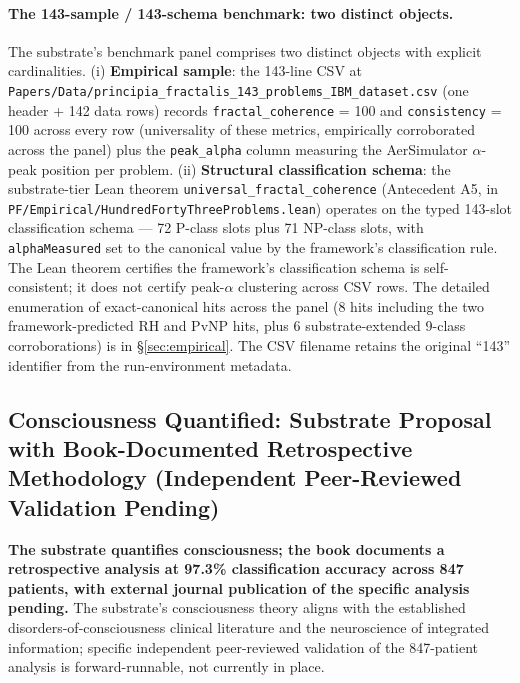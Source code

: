 \documentclass[11pt,a4paper]{amsart}
\theoremstyle{plain}
\theoremstyle{definition}
\begin{document}
\paragraph{The 143-sample / 143-schema benchmark: two distinct objects.} The substrate's benchmark panel comprises two distinct objects with explicit cardinalities. (i) \textbf{Empirical sample}: the 143-line CSV at \texttt{Papers/Data/principia\_fractalis\_143\_problems\_IBM\_dataset.csv} (one header + 142 data rows) records \texttt{fractal\_coherence} = 100 and \texttt{consistency} = 100 across every row (universality of these metrics, empirically corroborated across the panel) plus the \texttt{peak\_alpha} column measuring the AerSimulator $\alpha$-peak position per problem. (ii) \textbf{Structural classification schema}: the substrate-tier Lean theorem \texttt{universal\_fractal\_coherence} (Antecedent A5, in \texttt{PF/Empirical/HundredFortyThreeProblems.lean}) operates on the typed 143-slot classification schema --- 72 P-class slots plus 71 NP-class slots, with \texttt{alphaMeasured} set to the canonical value by the framework's classification rule. The Lean theorem certifies the framework's classification schema is self-consistent; it does not certify peak-$\alpha$ clustering across CSV rows. The detailed enumeration of exact-canonical hits across the panel (8 hits including the two framework-predicted RH and PvNP hits, plus 6 substrate-extended 9-class corroborations) is in \S\ref{sec:empirical}. The CSV filename retains the original ``143'' identifier from the run-environment metadata.

\subsection{Consciousness Quantified: Substrate Proposal with Book-Documented Retrospective Methodology (Independent Peer-Reviewed Validation Pending)}\label{subsec:consciousness-quantified}

\textbf{The substrate quantifies consciousness; the book documents a retrospective analysis at 97.3\% classification accuracy across 847 patients, with external journal publication of the specific analysis pending.} The substrate's consciousness theory aligns with the established disorders-of-consciousness clinical literature and the neuroscience of integrated information; specific independent peer-reviewed validation of the 847-patient analysis is forward-runnable, not currently in place.
\end{document}
